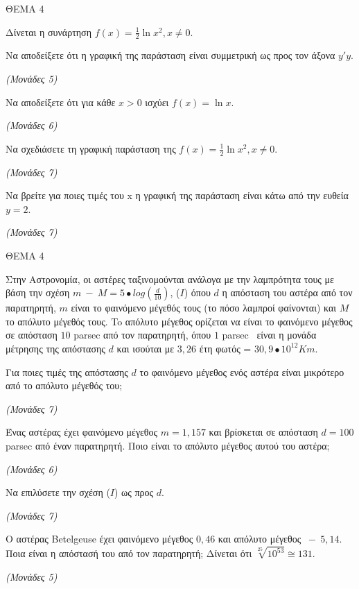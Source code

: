 \documentclass[11pt,a4paper,twoside]{book}
\newcommand{\monades}[1]{\hfill \textit{(Μονάδες #1)}}
\begin{document}
\vspace{4mm}

ΘΕΜΑ 4

Δίνεται η συνάρτηση $f(x) = \frac{1}{2} \ln x^2, x \neq 0$.

\begin{alist}
\item Να αποδείξετε ότι η γραφική της παράσταση είναι συμμετρική ως προς τον άξονα $y'y$.

\monades{5}

\item Να αποδείξετε ότι για κάθε $x > 0$ ισχύει $f(x) = \ln x$.

\monades{6}

\item Να σχεδιάσετε τη γραφική παράσταση της $f(x) = \frac{1}{2} \ln x^2, x \neq 0$.

\monades{7}

\item Να βρείτε για ποιες τιμές του x η γραφική της παράσταση είναι κάτω από την ευθεία $y = 2$.

\monades{7}
\end{alist}

\vspace{4mm}

ΘΕΜΑ 4

Στην Αστρονομία, οι αστέρες ταξινομούνται ανάλογα με την λαμπρότητα τους με βάση την σχέση $m\  - \ M = 5 \bullet log\left( \frac{d}{10} \right)$, ($I$) όπου $d$ η απόσταση του αστέρα από τον παρατηρητή, $m$ είναι το φαινόμενο μέγεθός τους (το πόσο λαμπροί φαίνονται) και $Μ$ το απόλυτο μέγεθός τους. To απόλυτο μέγεθος ορίζεται να είναι το φαινόμενο μέγεθος σε απόσταση $10$ parsec από τον παρατηρητή, όπου $1$ parsec~ είναι η μονάδα μέτρησης της απόστασης $d$ και ισούται με $3,26$ έτη φωτός = $30,9 \bullet 10^{12}Km$.

\begin{alist}
\item Για ποιες τιμές της απόστασης $d$ το φαινόμενο μέγεθος ενός αστέρα είναι μικρότερο από το απόλυτο μέγεθός του;

\monades{7}

\item Ένας αστέρας έχει φαινόμενο μέγεθος $m = 1,157$ και βρίσκεται σε απόσταση $d = 100$ parsec από έναν παρατηρητή. Ποιο είναι το απόλυτο μέγεθος αυτού του αστέρα;

\monades{6}

\item Να επιλύσετε την σχέση ($I$) ως προς $d$.

\monades{7}

\item Ο αστέρας Betelgeuse έχει φαινόμενο μέγεθος $0,46$ και απόλυτο μέγεθος $\  - \ 5,14$. Ποια είναι η απόστασή του από τον παρατηρητή; Δίνεται ότι $\sqrt[25]{10^{53}} \cong 131$.

\monades{5}
\end{alist}
\end{document}
